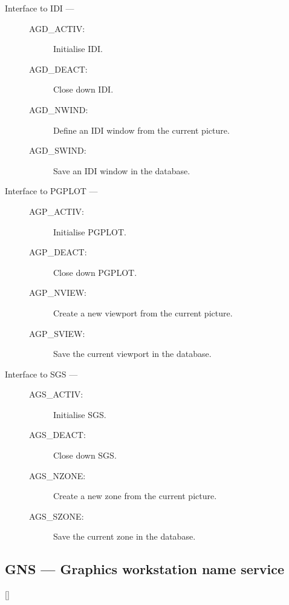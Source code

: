 \begin{description}
\item [Interface to IDI ---]

\begin{description}
\item [AGD\_ACTIV:]  Initialise IDI.
\item [AGD\_DEACT:]  Close down IDI.
\item [AGD\_NWIND:]  Define an IDI window from the current picture.
\item [AGD\_SWIND:]  Save an IDI window in the database.
\end{description}

\item [Interface to PGPLOT ---]

\begin{description}
\item [AGP\_ACTIV:]  Initialise PGPLOT.
\item [AGP\_DEACT:]  Close down PGPLOT.
\item [AGP\_NVIEW:]  Create a new viewport from the current picture.
\item [AGP\_SVIEW:]  Save the current viewport in the database.
\end{description}

\item [Interface to SGS ---]

\begin{description}
\item [AGS\_ACTIV:]  Initialise SGS.
\item [AGS\_DEACT:]  Close down SGS.
\item [AGS\_NZONE:]  Create a new zone from the current picture.
\item [AGS\_SZONE:]  Save the current zone in the database.
\end{description}

\end{description}

\newpage

\subsection{GNS --- Graphics workstation name service}

\vspace{-9mm}

\hfill []

\vspace{2mm}

